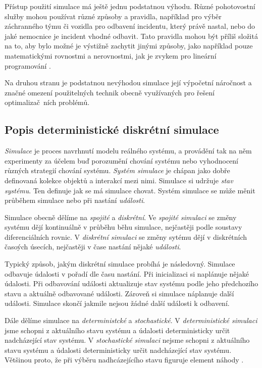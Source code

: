 Přístup použití simulace má ještě jednu podstatnou výhodu.
Různé pohotovostní služby mohou používat různé způsoby a pravidla, například pro výběr záchranného týmu či vozidla pro odbavení incidentu, který právě nastal, nebo do jaké nemocnice je incident vhodné odbavit.
Tato pravidla mohou být příliš složitá na to, aby bylo možné je výstižně zachytit jinými způsoby, jako například pouze matematickými rovnostmi a nerovnostmi, jak je zvykem pro lineární programování \cite{LP}.

Na druhou stranu je podstatnou nevýhodou simulace její výpočetní náročnost a značné omezení použitelných technik obecně využívaných pro řešení optimalizač~ních problémů.

\subsection{Popis deterministické diskrétní simulace}

\textit{Simulace} je proces navrhnutí modelu reálného systému, a provádění tak na něm experimenty za účelem buď porozumění chování systému
nebo vyhodnocení různých strategií chování systému.
\textit{Systém simulace} je chápan jako dobře definovaná kolekce objektů a interakcí mezi nimi.
Simulace si udržuje \textit{stav systému}. Ten definuje jak se má simulace chovat.
Systém simulace se může měnit průběhem simulace nebo při nastání \textit{události}.

Simulace obecně dělíme na \textit{spojité} a \textit{diskrétní}.
Ve \textit{spojité simulaci} se změny systému dějí kontinuálně v průběhu běhu simulace, nejčastěji podle soustavy diferenciálních rovnic.
V \textit{diskrétní simulaci} se změny sytému dějí v diskrétních časoých úsecích, nejčastěji v čase nastání nějaké \textit{události}.

Typický způsob, jakým diskrétní simulace probíhá je následovný.
Simulace odbavuje údalosti v pořadí dle času nastání.
Při inicializaci si naplánuje nějaké údalosti.
Při odbavování události aktualizuje stav systému podle jeho předchozího stavu a aktuálně odbavované události. Zároveň si simulace náplanuje další události. 
Simulace skončí jakmile nejsou žádné další události k odbavení.

Dále dělíme simulace na \textit{deterministcké} a \textit{stochastické}.
V \textit{deterministické simulaci} jsme schopni z aktuálního stavu systému a údalosti deterministicky určit nadcházející stav systému.
V \textit{stochastické simulaci} nejsme schopni z aktuálního stavu systému a údalosti deterministicky určit nadcházející stav systému.
Většinou proto, že při výběru nadhcázejícího stavu figuruje element náhody
\cite{SimulaceBook}.

